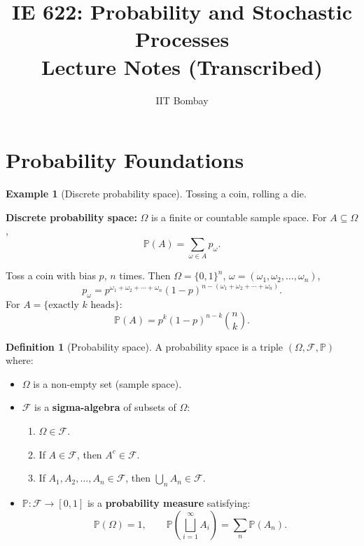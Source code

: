 \documentclass[12pt, a4paper]{article}
\title{IE 622: Probability and Stochastic Processes\\
\large Lecture Notes (Transcribed)}
\date{IIT Bombay}
\theoremstyle{definition}
\newtheorem{definition}{Definition}[section]
\newtheorem{example}{Example}[section]
\theoremstyle{plain}
\newcommand{\PP}{\mathbb{P}}
\newcommand{\FF}{\mathcal{F}}
\begin{document}
\maketitle
\tableofcontents
\newpage

\section{Probability Foundations}

\begin{example}[Discrete probability space]
Tossing a coin, rolling a die.

\textbf{Discrete probability space:} $\Omega$ is a finite or countable sample space. For $A \subseteq \Omega$,
\begin{equation*}
  \PP(A) = \sum_{\omega \in A} p_\omega.
\end{equation*}

Toss a coin with bias $p$, $n$ times. Then $\Omega = \{0,1\}^n$, $\omega = (\omega_1, \omega_2, \ldots, \omega_n)$,
\begin{equation*}
  p_\omega = p^{\omega_1+\omega_2+\cdots+\omega_n}(1-p)^{n-(\omega_1+\omega_2+\cdots+\omega_n)}.
\end{equation*}
For $A = \{\text{exactly } k \text{ heads}\}$:
\begin{equation*}
  \PP(A) = p^k(1-p)^{n-k}\binom{n}{k}.
\end{equation*}
\end{example}

\begin{definition}[Probability space]
A probability space is a triple $(\Omega, \FF, \PP)$ where:
\begin{itemize}
  \item $\Omega$ is a non-empty set (sample space).
  \item $\FF$ is a \textbf{sigma-algebra} of subsets of $\Omega$:
    \begin{enumerate}[label=(\roman*)]
      \item $\Omega \in \FF$.
      \item If $A \in \FF$, then $A^c \in \FF$.
      \item If $A_1, A_2, \ldots, A_n \in \FF$, then $\bigcup_n A_n \in \FF$.
    \end{enumerate}
  \item $\PP : \FF \to [0,1]$ is a \textbf{probability measure} satisfying:
    \begin{equation*}
      \PP(\Omega) = 1, \qquad \PP\!\left(\bigsqcup_{i=1}^{\infty} A_i\right) = \sum_n \PP(A_n).
    \end{equation*}
\end{itemize}
\end{definition}
\end{document}
